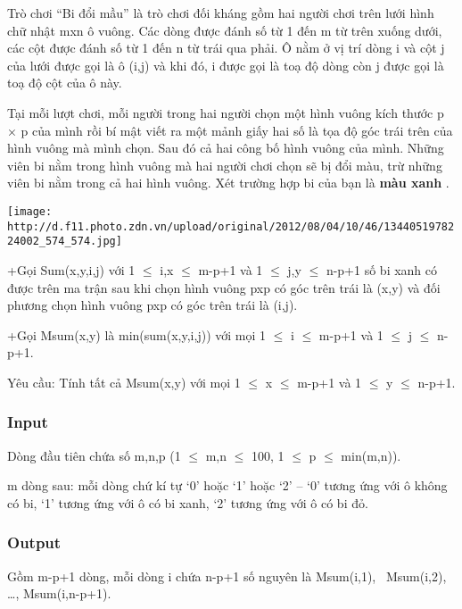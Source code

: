 



   Trò chơi “Bi đổi mầu” là trò chơi đối kháng gồm hai người chơi trên lưới hình chữ nhật                                                   mxn ô vuông. Các dòng được đánh số từ 1 đến    m từ trên xuống dưới, các cột được đánh số từ 1 đến    n từ trái qua phải. Ô nằm ở vị trí dòng    i và cột j    của lưới được gọi là ô (i,j) và khi đó, i được gọi là toạ độ dòng còn j được gọi là toạ độ cột của ô này.  

   Tại mỗi lượt chơi, mỗi người trong hai người chọn một hình vuông kích thước   p   ×   p   của mình rồi bí mật viết ra một mảnh giấy hai số là tọa độ góc trái trên của hình vuông mà mình chọn. Sau đó cả hai công bố hình vuông của mình. Những viên bi nằm trong hình vuông mà hai người chơi chọn sẽ bị đổi màu, trừ những viên bi nằm trong cả hai hình vuông. Xét trường hợp bi của bạn là   \textbf{    màu xanh   }   .  




\texttt{[image: http://d.f11.photo.zdn.vn/upload/original/2012/08/04/10/46/1344051978224002\_574\_574.jpg]}

   +Gọi Sum(x,y,i,j) với 1 $\le$ i,x $\le$ m-p+1 và 1 $\le$ j,y $\le$ n-p+1 số bi xanh có được trên ma trận sau khi chọn hình vuông pxp có góc trên trái là (x,y) và đối phương chọn hình vuông pxp có góc trên trái là (i,j).  

   +Gọi Msum(x,y) là min(sum(x,y,i,j)) với mọi 1 $\le$ i $\le$ m-p+1 và 1 $\le$ j $\le$ n-p+1.  

   Yêu cầu: Tính tất cả Msum(x,y) với mọi 1 $\le$ x $\le$ m-p+1 và 1 $\le$ y $\le$ n-p+1.  

\subsubsection{   Input  }

   Dòng đầu tiên chứa số m,n,p (1 $\le$ m,n $\le$ 100, 1 $\le$ p $\le$ min(m,n)).  

   m dòng sau: mỗi dòng chứ kí tự ‘0’ hoặc ‘1’ hoặc ‘2’ – ‘0’ tương ứng với ô không có bi, ‘1’ tương ứng với ô có bi xanh, ‘2’ tương ứng với ô có bi đỏ.  

\subsubsection{   Output  }

   Gồm m-p+1 dòng, mỗi dòng i chứa n-p+1 số nguyên là Msum(i,1),  Msum(i,2), …, Msum(i,n-p+1).  

